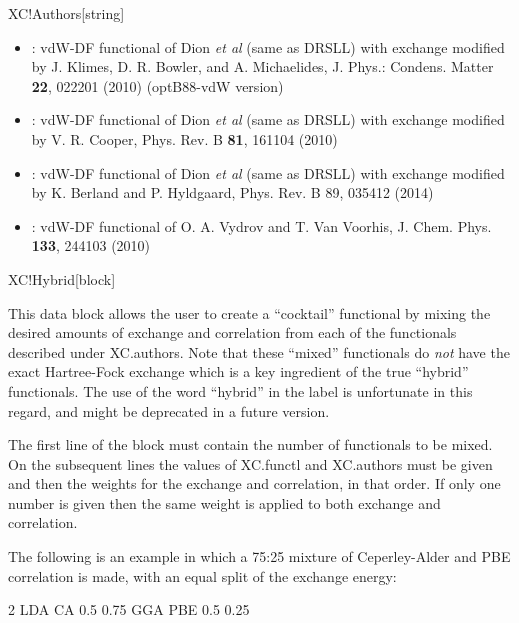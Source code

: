 \begin{fdfentry}{XC!Authors}[string]
\begin{itemize}
    \item%
    : %
    vdW-DF functional of Dion \textit{et al} (same as DRSLL)
    with exchange modified by J. Klimes, D. R. Bowler, and A. Michaelides, 
    J. Phys.: Condens. Matter \textbf{22}, 022201 (2010) (optB88-vdW version)
    
    \item%
    : %
    vdW-DF functional of Dion \textit{et al} (same as DRSLL)
    with exchange modified by V. R. Cooper, Phys. Rev. B \textbf{81}, 161104 (2010)
    
    \item%
    : %
    vdW-DF functional of Dion \textit{et al} (same as DRSLL) 
    with exchange modified by 
    K. Berland and P. Hyldgaard, Phys. Rev. B 89, 035412 (2014)
    
    \item%
    : %
    vdW-DF functional of O. A. Vydrov and T. Van Voorhis, 
    J. Chem. Phys. \textbf{133}, 244103 (2010)
    
  \end{itemize}

\end{fdfentry}


\begin{fdfentry}{XC!Hybrid}[block]
  
  This data block allows the user to create a ``cocktail'' functional by
  mixing the desired amounts of exchange and correlation from each of
  the functionals described under XC.authors. Note that these ``mixed''
  functionals do \emph{not} have the exact Hartree-Fock exchange which
  is a key ingredient of the true ``hybrid'' functionals. The use of
  the word ``hybrid'' in the label is unfortunate in this regard, and
  might be deprecated in a future version.

  The first line of the block must contain the number of functionals to
  be mixed. On the subsequent lines the values of XC.functl and
  XC.authors must be given and then the weights for the exchange and
  correlation, in that order. If only one number is given then the same
  weight is applied to both exchange and correlation.

  The following is an example in which a 75:25 mixture of Ceperley-Alder
  and PBE correlation is made, with an equal split of the exchange
  energy:
  
  \begin{fdfexample}
        2
        LDA CA  0.5 0.75
        GGA PBE 0.5 0.25
  \end{fdfexample}

\end{fdfentry}




